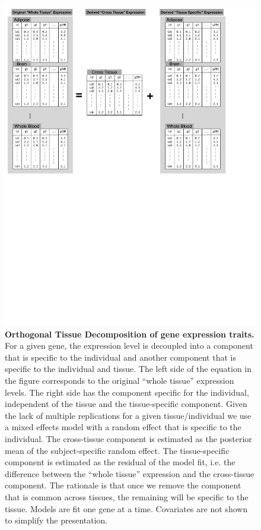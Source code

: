 \documentclass[10pt,letterpaper]{article}
\begin{document}
\begin{figure}[H]
\includegraphics[width=\textwidth]{Figures/OTD.pdf}
\caption{\textbf{Orthogonal Tissue Decomposition of gene expression traits.} For a given gene, the expression level is decoupled into a component that is specific to the individual and another component that is specific to the individual and tissue. The left side of the equation in the figure corresponds to the original ``whole tissue'' expression levels. The right side has the component specific for the individual, independent of the tissue and the tissue-specific component. Given the lack of multiple replications for a given tissue/individual we use a mixed effects model with a random effect that is specific to the individual. The cross-tissue component is estimated as the posterior mean of the subject-specific random effect. The tissue-specific component is estimated as the residual of the model fit, i.e. the difference between the ``whole tissue'' expression and the cross-tissue component. The rationale is that once we remove the component that is common across tissues, the remaining will be specific to the tissue. Models are fit one gene at a time. Covariates are not shown to simplify the presentation.}
\label{fig-OTD}
\end{figure}
\end{document}
